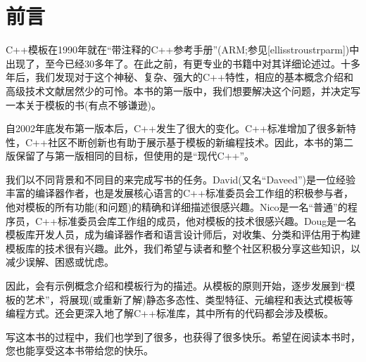 \chapter{前言}

C++模板在1990年就在“带注释的C++参考手册”(ARM;参见[ellisstroustrparm])中出现了，至今已经30多年了。在此之前，有更专业的书籍中对其详细论述过。十多年后，我们发现对于这个神秘、复杂、强大的C++特性，相应的基本概念介绍和高级技术文献居然少的可怜。本书的第一版中，我们想要解决这个问题，并决定写一本关于模板的书(有点不够谦逊)。

自2002年底发布第一版本后，C++发生了很大的变化。C++标准增加了很多新特性，C++社区不断创新也有助于展示基于模板的新编程技术。因此，本书的第二版保留了与第一版相同的目标，但使用的是“现代C++”。

我们以不同背景和不同目的来完成写书的任务。David(又名“Daveed”)是一位经验丰富的编译器作者，也是发展核心语言的C++标准委员会工作组的积极参与者，他对模板的所有功能(和问题)的精确和详细描述很感兴趣。Nico是一名“普通”的程序员，C++标准委员会库工作组的成员，他对模板的技术很感兴趣。Doug是一名模板库开发人员，成为编译器作者和语言设计师后，对收集、分类和评估用于构建模板库的技术很有兴趣。此外，我们希望与读者和整个社区积极分享这些知识，以减少误解、困惑或忧虑。

因此，会有示例概念介绍和模板行为的描述。从模板的原则开始，逐步发展到“模板的艺术”，将展现(或重新了解)静态多态性、类型特征、元编程和表达式模板等编程方式。还会更深入地了解C++标准库，其中所有的代码都会涉及模板。

写这本书的过程中，我们也学到了很多，也获得了很多快乐。希望在阅读本书时，您也能享受这本书带给您的快乐。